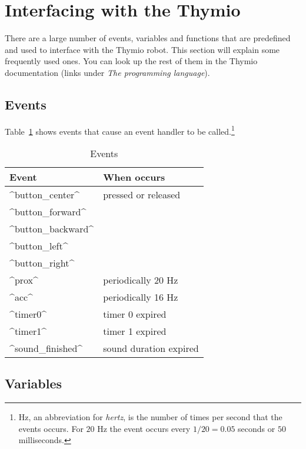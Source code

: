 \documentclass[11pt,a4paper]{article}
\begin{document}

\section{Interfacing with the Thymio}\label{s.interface}

There are a large number of events, variables and functions that are predefined and used to interface with the Thymio robot. This section will explain some frequently used ones. You can look up the rest of them in the Thymio documentation \cite{thymio} (links under \textit{The programming language}).

\subsection{Events}

Table~\ref{t.events} shows events that cause an event handler to be called.\footnote{Hz, an abbreviation for \emph{hertz}, is the number of times per second that the events occurs. For $20$ Hz the event occurs every $1/20=0.05$ seconds or $50$ milliseconds.}

\begin{table}[t]
\renewcommand{\arraystretch}{.85}
\begin{center}
\begin{tabular}{|l|l|}
\hline
Event& When occurs\\\hline
^button_center^& pressed or released\\
^button_forward^&\\
^button_backward^&\\
^button_left^&\\
^button_right^&\\
\hline
^prox^&periodically 20 Hz\\
^acc^&periodically 16 Hz\\
\hline
^timer0^&timer 0 expired\\
^timer1^&timer 1 expired\\
^sound_finished^&sound duration expired\\
\hline
\end{tabular}
\end{center}
\caption{Events}\label{t.events}
\end{table}

\subsection{Variables}
\end{document}
